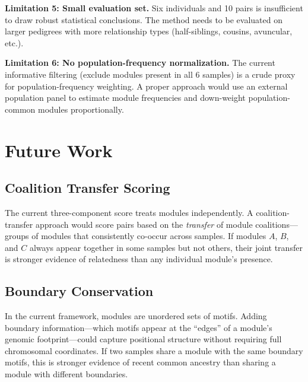 \documentclass{../yalumba}
\begin{document}
\begin{limitation}
\textbf{Limitation 5: Small evaluation set.}  Six individuals and 10 pairs
is insufficient to draw robust statistical conclusions.  The method needs to
be evaluated on larger pedigrees with more relationship types (half-siblings,
cousins, avuncular, etc.).
\end{limitation}

\begin{limitation}
\textbf{Limitation 6: No population-frequency normalization.}  The current
informative filtering (exclude modules present in all 6 samples) is a crude
proxy for population-frequency weighting.  A proper approach would use an
external population panel to estimate module frequencies and down-weight
population-common modules proportionally.
\end{limitation}


\section{Future Work}
\label{sec:future}

\subsection{Coalition Transfer Scoring}

The current three-component score treats modules independently.  A
coalition-transfer approach would score pairs based on the \emph{transfer}
of module coalitions---groups of modules that consistently co-occur across
samples.  If modules $A$, $B$, and $C$ always appear together in some
samples but not others, their joint transfer is stronger evidence of
relatedness than any individual module's presence.

\subsection{Boundary Conservation}

In the current framework, modules are unordered sets of motifs.  Adding
boundary information---which motifs appear at the ``edges'' of a module's
genomic footprint---could capture positional structure without requiring
full chromosomal coordinates.  If two samples share a module with the same
boundary motifs, this is stronger evidence of recent common ancestry than
sharing a module with different boundaries.
\end{document}
